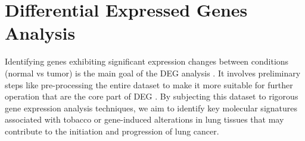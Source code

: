 \documentclass[
	a4paper, %
	10pt, %
	unnumberedsections, %
	twoside, %
]{LTJournalArticle}
\begin{document}

\section{Differential Expressed Genes Analysis}

Identifying genes exhibiting significant expression changes between conditions (normal vs tumor) is the main goal of the DEG analysis \cite{rosati2024differential}. It involves preliminary steps like pre-processing the entire dataset to make it more suitable for further operation that are the core part of DEG \cite{rosati2024differential}. By subjecting this dataset to rigorous gene expression analysis techniques, we aim to identify key molecular signatures associated with tobacco or gene-induced alterations in lung tissues that may contribute to the initiation and progression of lung cancer. 
\end{document}
